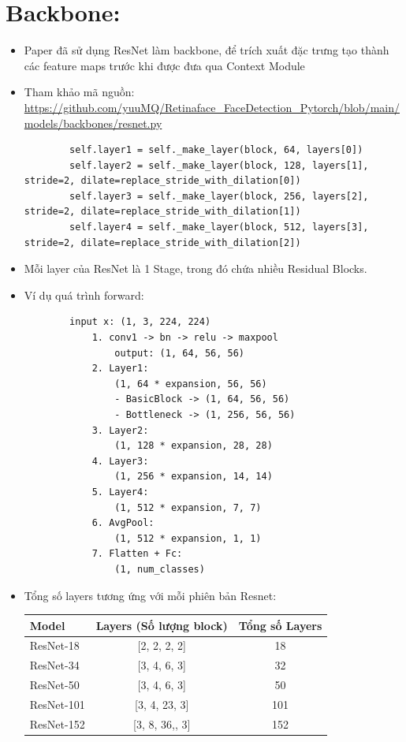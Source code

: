 \documentclass[12pt, a4paper, oneside]{book}
\theoremstyle{plain}
\numberwithin{equation}{chapter} \DeclareMathOperator{\Var}{var}
\begin{document}
\section{Backbone:}
\begin{itemize}
    \item [--] Paper đã sử dụng ResNet làm backbone, để trích xuất đặc trưng tạo thành các feature maps trước khi được đưa qua Context Module
    \item [--] Tham khảo mã nguồn: \\
    \vspace{0.2cm}
    \url{https://github.com/yuuMQ/Retinaface_FaceDetection_Pytorch/blob/main/models/backbones/resnet.py}
    \begin{lstlisting}
        self.layer1 = self._make_layer(block, 64, layers[0])
        self.layer2 = self._make_layer(block, 128, layers[1], stride=2, dilate=replace_stride_with_dilation[0])
        self.layer3 = self._make_layer(block, 256, layers[2], stride=2, dilate=replace_stride_with_dilation[1])
        self.layer4 = self._make_layer(block, 512, layers[3], stride=2, dilate=replace_stride_with_dilation[2])

    \end{lstlisting}
    \item [--] Mỗi layer của ResNet là 1 Stage, trong đó chứa nhiều Residual Blocks.
    \item [--] Ví dụ quá trình forward:
    \begin{lstlisting}
        input x: (1, 3, 224, 224)
            1. conv1 -> bn -> relu -> maxpool
                output: (1, 64, 56, 56)
            2. Layer1:
                (1, 64 * expansion, 56, 56)
                - BasicBlock -> (1, 64, 56, 56)
                - Bottleneck -> (1, 256, 56, 56)
            3. Layer2:
                (1, 128 * expansion, 28, 28)
            4. Layer3:
                (1, 256 * expansion, 14, 14)
            5. Layer4:
                (1, 512 * expansion, 7, 7)
            6. AvgPool:
                (1, 512 * expansion, 1, 1)
            7. Flatten + Fc:
                (1, num_classes)
    \end{lstlisting}
    \newpage
    \item [--] Tổng số layers tương ứng với mỗi phiên bản Resnet:
    \begin{center}
        \begin{tabular}{|l|c|c|}
            \hline
            \textbf{Model} & \textbf{Layers (Số lượng block)} & \textbf{Tổng số Layers} \\
            \hline
            ResNet-18 & [2, 2, 2, 2] & 18 \\
            \hline
            ResNet-34 & [3, 4, 6, 3] & 32 \\
            \hline
            ResNet-50 & [3, 4, 6, 3] & 50 \\
            \hline
            ResNet-101 & [3, 4, 23, 3] & 101 \\
            \hline
            ResNet-152 & [3, 8, 36,, 3] & 152 \\
            \hline
        \end{tabular}
    \end{center}

\end{itemize}
\end{document}
